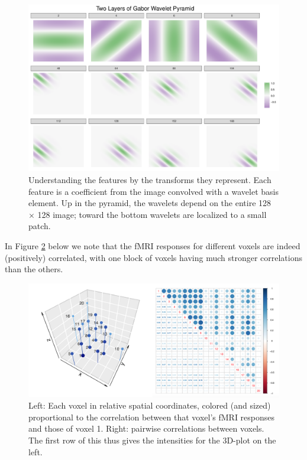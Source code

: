 \documentclass[main]{subfiles}
\begin{document}
\begin{figure}[h!]
\centering
\includegraphics[width = 12cm]{../fmri_study/plots/wav_viz.pdf}
\caption{Understanding the features by the transforms they represent. Each feature is a coefficient from the image convolved with a wavelet basis element. Up in the pyramid, the wavelets depend on the entire 128 $\times$ 128 image; toward the bottom wavelets are localized to a small patch.}
\label{fig-features}
\end{figure}


\newpage

\noindent In Figure \ref{fig-cor} below we note that the fMRI responses for different voxels are indeed (positively) correlated, with one block of voxels having much stronger correlations than the others. 

\begin{figure}[h!]
\centering
\includegraphics[width = 14cm]{../fmri_study/plots/corr_plot}
\caption{Left: Each voxel in relative spatial coordinates, colored (and sized) proportional to the correlation between that voxel's fMRI responses and those of voxel 1. Right: pairwise correlations between voxels. The first row of this thus gives the intensities for the 3D-plot on the left.}
\label{fig-cor}
\end{figure}
\end{document}
